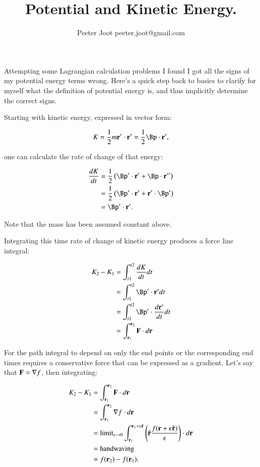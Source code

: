\documentclass{article}      %
\title{ Potential and Kinetic Energy.}
\author{Peeter Joot \quad peeter.joot@gmail.com}
\date{}
\newcommand{\grad}[0]{\nabla}
\begin{document}
             

\maketitle{}

\section{}

Attempting some Lagrangian calculation problems I found I got all the signs of my potential energy terms wrong.  Here's a quick step back to basics to clarify for myself what the definition of potential energy is, and thus implicitly determine the correct signs.

Starting with kinetic energy, expressed in vector form:

\begin{equation*}
K 
= \inv{2} m \Br' \cdot \Br' 
= \inv{2} \Bp \cdot \Br',
\end{equation*}

one can calculate the rate of change of that energy:

\begin{align*}
\frac{dK }{dt}
&= \inv{2} \left(\Bp' \cdot \Br' + \Bp \cdot \Br''\right) \\
&= \inv{2} \left(\Bp' \cdot \Br' + \Br' \cdot \Bp'\right) \\
&= \Bp' \cdot \Br'.
\end{align*}

Note that the mass has been assumed constant above.

Integrating this time rate of change of kinetic energy produces a force
line 
integral:

\begin{align*}
K_2 - K_1 
&= \int_{t1}^{t2} \frac{dK}{dt} dt \\
&= \int_{t1}^{t2} \Bp' \cdot \Br' dt \\
&= \int_{t1}^{t2} \Bp' \cdot \frac{d\Br'}{dt} dt \\
&= \int_{\Br_1}^{\Br_2} \BF \cdot d\Br
\end{align*}

For the path integral to depend on only the end points or the corresponding end times requires a conservative force that can be expressed as a gradient.
Let's say that $\BF = \grad f$, then integrating:

\begin{align*}
K_2 - K_1 
&= \int_{\Br_1}^{\Br_2} \BF \cdot d\Br \\
&= \int_{\Br_1}^{\Br_2} \grad f \cdot d\Br \\
&= {\text{limit}}_{\epsilon \rightarrow 0} \int_{\Br_1}^{\Br_1 + \epsilon\rcap}
   \left(\rcap \frac{f(\Br + \epsilon \rcap)}{\epsilon}\right)
      \cdot d\Br \\
&= \text{handwaving} \\
&= f(\Br_2) - f(\Br_1).
\end{align*}
\end{document}

